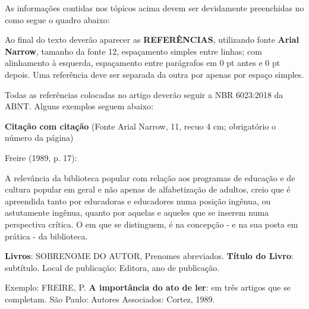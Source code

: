 As informações contidas nos tópicos acima devem ser devidamente preenchidas no como segue o quadro abaixo:


Ao final do texto deverão aparecer as \textbf{REFERÊNCIAS}, utilizando fonte \textbf{Arial Narrow}, tamanho da fonte 12, espaçamento simples entre linhas; com alinhamento à esquerda, espaçamento entre parágrafos em 0 pt antes e 0 pt depois. Uma referência deve ser separada da outra por apenas por espaço simples.

Todas as referências colocadas no artigo deverão seguir a NBR 6023:2018 da ABNT. Alguns exemplos seguem abaixo:

\textbf{Citação com citação} (Fonte Arial Narrow, 11, recuo 4 cm; obrigatório o número da página)

Freire (1989, p. 17):
\begin{citacao}
A relevância da biblioteca popular com relação aos programas de educação e de cultura popular em geral e não apenas de alfabetização de adultos, creio que é apreendida tanto por educadoras e educadores numa posição ingênua, ou astutamente ingênua, quanto por aquelas e aqueles que se inserem numa perspectiva crítica. O em que se distinguem, é na concepção - e na sua posta em prática - da biblioteca.
\end{citacao}

\textbf{Livros}:
SOBRENOME DO AUTOR, Prenomes abreviados. \textbf{Título do Livro}: subtítulo. Local de publicação: Editora, ano de publicação.

Exemplo:
FREIRE, P. \textbf{A importância do ato de ler}: em três artigos que se completam. São Paulo: Autores Associados: Cortez, 1989.

